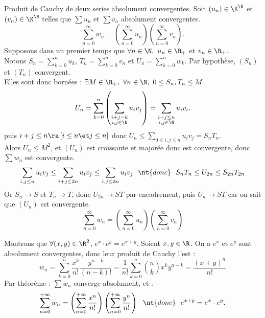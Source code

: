 \documentclass[11pt]{article}
\begin{document}
\begin{prop}{Produit de Cauchy de deux series absolument convergentes.}{}
    Soit $(u_n)\in\K^\N$ et $(v_n)\in\K^\N$ telles que $\sum u_n$ et $\sum v_n$ absolument convergentes.
    \begin{equation*}
        \sum_{n=0}^{\infty} w_n = \left( \sum_{n=0}^{\infty} u_n \right) \left( \sum_{n=0}^{\infty} v_n \right).
    \end{equation*}
    \tcblower
    Supposons dans un premier temps que $\forall n \in \N, ~ u_n \in \R_+$ et $v_n\in\R_+$.\\
    Notons $S_n=\sum_{k=0}^n u_k$, $T_n = \sum_{k=0}^n v_n$ et $U_n = \sum_{k=0}^n w_k$. Par hypothèse, $(S_n)$ et $(T_n)$ convergent.\\
    Elles sont donc bornées : $\exists M \in \R_+, ~ \forall n \in \N, ~ 0 \leq S_n, T_n \leq M$.
    \begin{equation*}
        U_n = \sum_{k=0}^n\left( \sum_{\substack{i+j=k\\i,j\in\N}} u_iv_j \right)=\sum_{\substack{i+j\leq n\\i,j\in\N}}u_iv_i.
    \end{equation*}
    puis $i+j\leq n \ra \left[ i \leq n \et j \leq n \right]$ donc $U_n \leq \sum_{0\leq i,j \leq n}u_iv_j=S_nT_n$.\\
    Alors $U_n \leq M^2$, et $(U_n)$ est croissante et majorée donc est convergente, donc $\sum w_n$ est convergente.
    \begin{equation*}
        \sum_{i,j\leq n}u_i v_j \leq \sum_{i+j\leq 2n}u_iv_j \leq \sum_{i,j\leq 2n}u_iv_j ~~\nt{donc}~~ S_nT_n \leq U_{2n} \leq S_{2n}T_{2n}
    \end{equation*}
    Or $S_n\to S$ et $T_n\to T$, donc $U_{2n}\to ST$ par encadrement, puis $U_n\to ST$ car on sait que $(U_n)$ est convergente.
    \begin{equation*}
        \sum_{n=0}^\infty w_n = \left( \sum_{n=0}^\infty u_n \right)\left( \sum_{n=0}^\infty v_n \right)
    \end{equation*}
\end{prop}

\begin{app*}{}{}
    Montrons que $\forall(x,y)\in\R^2$, $e^x\cdot e^y=e^{x+y}$.
    \tcblower
    Soient $x,y\in\R$. On a $e^x$ et $e^y$ sont absolument convergentes, donc leur produit de Cauchy l'est :
    \begin{equation*}
        w_n=\sum_{k=0}^n\frac{x^k}{n!}\frac{y^{n-k}}{(n-k)!}=\frac{1}{n!}\sum_{k=0}^n\binom{n}{k}x^ky^{n-k}=\frac{(x+y)^n}{n!}
    \end{equation*}
    Par théorème : $\sum w_n$ converge absolument, et :
    \begin{equation*}
        \sum_{n=0}^{+\infty}w_n = \left( \sum_{n=0}^{+\infty}\frac{x^n}{n!} \right)\left( \sum_{n=0}^{+\infty}\frac{y^n}{n!} \right) ~~\nt{donc}~~ e^{x+y}=e^x\cdot e^y.
    \end{equation*} 
\end{app*}
\end{document}
